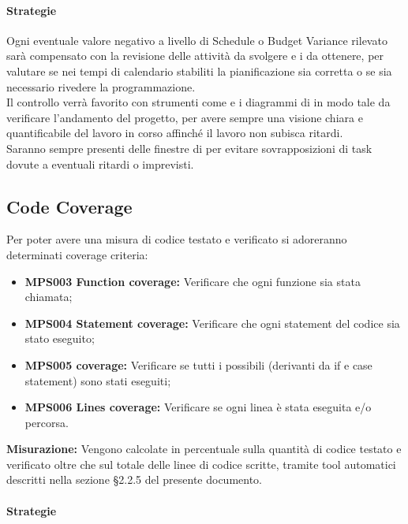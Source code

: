 \documentclass[NormeDiProgetto.tex]{subfiles}
\begin{document}
	\paragraph{Strategie}
	Ogni eventuale valore negativo a livello di Schedule o Budget Variance rilevato sarà compensato con la revisione delle attività da svolgere e i  da ottenere, per valutare se nei tempi di calendario stabiliti la pianificazione sia corretta o se sia necessario rivedere la programmazione.\\
	Il controllo verrà favorito con strumenti come  e i diagrammi di  in modo tale da verificare l'andamento del progetto, per avere sempre una visione chiara e quantificabile del lavoro in corso affinché il lavoro non subisca ritardi.\\
	Saranno sempre presenti delle finestre di  per evitare sovrapposizioni di task dovute a eventuali ritardi o imprevisti. 
	
	\subsection{Code Coverage}
	Per poter avere una misura di codice testato e verificato si adoreranno determinati coverage criteria:
	
	\begin{itemize}
		\item \textbf{MPS003 Function coverage:} Verificare che ogni funzione sia stata chiamata;
		\item \textbf{MPS004 Statement coverage:} Verificare che ogni statement del codice sia stato eseguito; 
		\item \textbf{MPS005  coverage:} Verificare se tutti i possibili  (derivanti da if e case statement) sono stati eseguiti;
		\item \textbf{MPS006 Lines coverage:} Verificare se ogni linea è stata eseguita e/o percorsa. 
		
	\end{itemize}
	\textbf{Misurazione:}
	Vengono calcolate in percentuale sulla quantità di codice testato e verificato oltre che sul totale delle linee di codice scritte, tramite tool automatici descritti nella sezione \S 2.2.5 del presente documento.
	
	\paragraph{Strategie}
	
\end{document}
